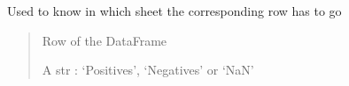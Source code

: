 \documentclass[letterpaper,10pt,english]{sphinxmanual}
\begin{document}
\begin{fulllineitems}
\label{\detokenize{excel:excel.classify_row}}
\pysigstartsignatures
{}
\pysigstopsignatures
\sphinxAtStartPar
Used to know in which sheet the corresponding row has to go
\begin{quote}\begin{description}
\sphinxAtStartPar
{} \textendash{} Row of the DataFrame

\sphinxAtStartPar
A str : ‘Positives’, ‘Negatives’ or ‘NaN’

\end{description}\end{quote}

\end{fulllineitems}

\end{document}
